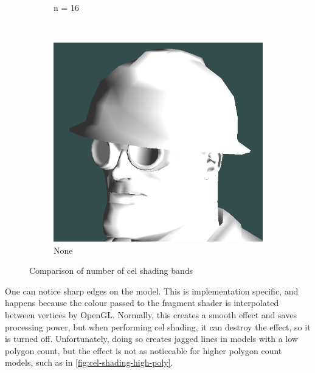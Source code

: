 \begin{figure}[h]
\begin{subfigure}[b]{0.15\textwidth}
        \caption{n = 16}
        \label{fig:cel-shading-n16}
    \end{subfigure}
    ~
    \begin{subfigure}[b]{0.15\textwidth}
        \includegraphics[width=\textwidth]{img/cel-shading-none.png}
        \caption{None}
        \label{fig:cel-shading-none}
    \end{subfigure}
    \caption{Comparison of number of cel shading bands}
    \label{fig:cel-band-comparison}
\end{figure}

One can notice sharp edges on the model. This is implementation specific, and happens because the 
colour passed to the fragment shader is interpolated between vertices by OpenGL. Normally, this creates 
a smooth effect and saves processing power, but when performing cel shading, it can destroy the effect, 
so it is turned off. Unfortunately, doing so creates jagged lines in models with a low polygon count, 
but the effect is  not as noticeable for higher polygon count models, such as in 
\autoref{fig:cel-shading-high-poly}. 

